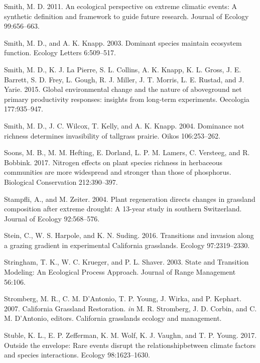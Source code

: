 \documentclass[twoside,12pt,final]{ucthesis-CA2012}
\begin{document}
\begin{ucmainmatter}
\leavevmode\hypertarget{ref-Smith2011b}{}%
Smith, M. D. 2011. An ecological perspective on extreme climatic events: A synthetic definition and framework to guide future research. Journal of Ecology 99:656--663.

\leavevmode\hypertarget{ref-Smith2003}{}%
Smith, M. D., and A. K. Knapp. 2003. Dominant species maintain ecosystem function. Ecology Letters 6:509--517.

\leavevmode\hypertarget{ref-Smith2015}{}%
Smith, M. D., K. J. La Pierre, S. L. Collins, A. K. Knapp, K. L. Gross, J. E. Barrett, S. D. Frey, L. Gough, R. J. Miller, J. T. Morris, L. E. Rustad, and J. Yarie. 2015. Global environmental change and the nature of aboveground net primary productivity responses: insights from long-term experiments. Oecologia 177:935--947.

\leavevmode\hypertarget{ref-Smith2004}{}%
Smith, M. D., J. C. Wilcox, T. Kelly, and A. K. Knapp. 2004. Dominance not richness determines invasibility of tallgrass prairie. Oikos 106:253--262.

\leavevmode\hypertarget{ref-Soons2017}{}%
Soons, M. B., M. M. Hefting, E. Dorland, L. P. M. Lamers, C. Versteeg, and R. Bobbink. 2017. Nitrogen effects on plant species richness in herbaceous communities are more widespread and stronger than those of phosphorus. Biological Conservation 212:390--397.

\leavevmode\hypertarget{ref-Stampfli2004}{}%
Stampfli, A., and M. Zeiter. 2004. Plant regeneration directs changes in grassland composition after extreme drought: A 13-year study in southern Switzerland. Journal of Ecology 92:568--576.

\leavevmode\hypertarget{ref-Stein2016}{}%
Stein, C., W. S. Harpole, and K. N. Suding. 2016. Transitions and invasion along a grazing gradient in experimental California grasslands. Ecology 97:2319--2330.

\leavevmode\hypertarget{ref-Stringham2003}{}%
Stringham, T. K., W. C. Krueger, and P. L. Shaver. 2003. State and Transition Modeling: An Ecological Process Approach. Journal of Range Management 56:106.

\leavevmode\hypertarget{ref-Stromberg2007}{}%
Stromberg, M. R., C. M. D'Antonio, T. P. Young, J. Wirka, and P. Kephart. 2007. California Grassland Restoration. \emph{in} M. R. Stromberg, J. D. Corbin, and C. M. D'Antonio, editors. California grasslands ecology and management.

\leavevmode\hypertarget{ref-Stuble2017}{}%
Stuble, K. L., E. P. Zefferman, K. M. Wolf, K. J. Vaughn, and T. P. Young. 2017. Outside the envelope: Rare events disrupt the relationshipbetween climate factors and species interactions. Ecology 98:1623--1630.


\end{ucmainmatter}
\end{document}
